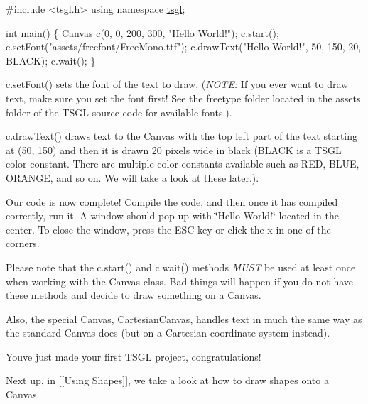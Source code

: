 \begin{DoxyCode}
\textcolor{preprocessor}{#include <tsgl.h>}
\textcolor{keyword}{using namespace }\hyperlink{namespacetsgl}{tsgl};

\textcolor{keywordtype}{int} main() \{
  \hyperlink{classtsgl_1_1_canvas}{Canvas} c(0, 0, 200, 300, \textcolor{stringliteral}{"Hello World!"});
  c.start();
  c.setFont(\textcolor{stringliteral}{"assets/freefont/FreeMono.ttf"});
  c.drawText(\textcolor{stringliteral}{"Hello World!"}, 50, 150, 20, BLACK);
  c.wait();
\}
\end{DoxyCode}


c.\+set\+Font() sets the font of the text to draw. ({\itshape N\+O\+T\+E\+:} If you ever want to draw text, make sure you set the font first! See the freetype folder located in the assets folder of the T\+S\+G\+L source code for available fonts.).

c.\+draw\+Text() draws text to the Canvas with the top left part of the text starting at (50, 150) and then it is drawn 20 pixels wide in black (B\+L\+A\+C\+K is a T\+S\+G\+L color constant. There are multiple color constants available such as R\+E\+D, B\+L\+U\+E, O\+R\+A\+N\+G\+E, and so on. We will take a look at these later.).

Our code is now complete! Compile the code, and then once it has compiled correctly, run it. A window should pop up with \char`\"{}\+Hello World!\char`\"{} located in the center. To close the window, press the E\+S\+C key or click the \textquotesingle{}x\textquotesingle{} in one of the corners.

Please note that the c.\+start() and c.\+wait() methods {\itshape M\+U\+S\+T} be used at least once when working with the Canvas class. Bad things will happen if you do not have these methods and decide to draw something on a Canvas.

Also, the special Canvas, Cartesian\+Canvas, handles text in much the same way as the standard Canvas does (but on a Cartesian coordinate system instead).

You\textquotesingle{}ve just made your first T\+S\+G\+L project, congratulations!

Next up, in \mbox{[}\mbox{[}Using Shapes\mbox{]}\mbox{]}, we take a look at how to draw shapes onto a Canvas. 